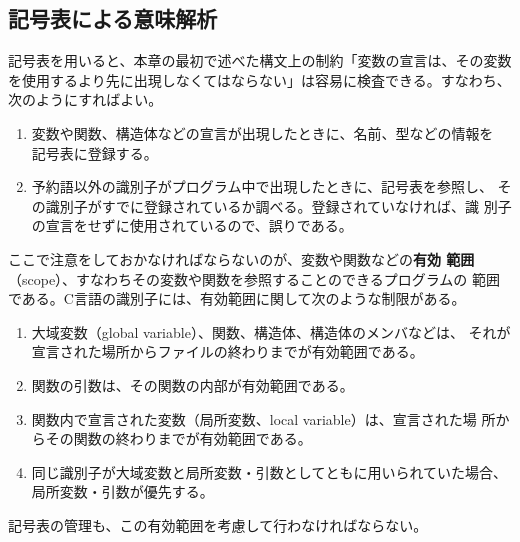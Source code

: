 \subsection{記号表による意味解析}

記号表を用いると、本章の最初で述べた構文上の制約「変数の宣言は、その変数
を使用するより先に出現しなくてはならない」は容易に検査できる。すなわち、
次のようにすればよい。
\begin{enumerate}
 \item 変数や関数、構造体などの宣言が出現したときに、名前、型などの情報を
       記号表に登録する。
 \item 予約語以外の識別子がプログラム中で出現したときに、記号表を参照し、
       その識別子がすでに登録されているか調べる。登録されていなければ、識
       別子の宣言をせずに使用されているので、誤りである。
\end{enumerate}

ここで注意をしておかなければならないのが、変数や関数などの{\bfseries 有効
範囲}（scope）、すなわちその変数や関数を参照することのできるプログラムの
範囲である。C言語の識別子には、有効範囲に関して次のような制限がある。
\begin{enumerate}
 \item 大域変数（global variable）、関数、構造体、構造体のメンバなどは、
       それが宣言された場所からファイルの終わりまでが有効範囲である。
       \label{144539_10Apr06}
 \item 関数の引数は、その関数の内部が有効範囲である。
       \label{144557_10Apr06}
 \item 関数内で宣言された変数（局所変数、local variable）は、宣言された場
       所からその関数の終わりまでが有効範囲である。
       \label{144603_10Apr06}
 \item 同じ識別子が大域変数と局所変数・引数としてともに用いられていた場合、
       局所変数・引数が優先する。
\end{enumerate}
記号表の管理も、この有効範囲を考慮して行わなければならない。

